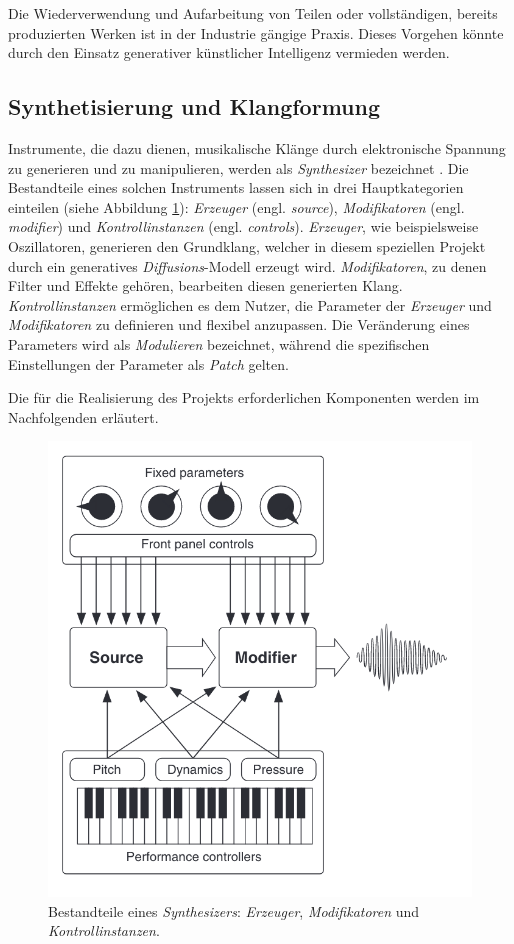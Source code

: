 \documentclass[
  a4paper,  %
  twoside,  %
  bibliography=totoc,
  headsepline,
  cleardoublepage=empty,
  parskip=half,
  draft=false
]{scrbook}
\begin{document}
Die Wiederverwendung und Aufarbeitung von Teilen oder vollständigen, bereits produzierten Werken ist in der Industrie gängige Praxis. Dieses Vorgehen könnte durch den Einsatz generativer künstlicher Intelligenz vermieden werden.

\subsection{Synthetisierung und Klangformung} \label{sec:synth+envelope}

Instrumente, die dazu dienen, musikalische Klänge durch elektronische Spannung zu generieren und zu manipulieren, werden als \emph{Synthesizer} bezeichnet \cite{dudenredaktion_synthesizer_nodate, pirkle_designing_2021}. Die Bestandteile eines solchen Instruments lassen sich in drei Hauptkategorien einteilen (siehe Abbildung \ref{fig:synth}): \emph{Erzeuger} (engl. \emph{source}), \emph{Modifikatoren} (engl. \emph{modifier}) und \emph{Kontrollinstanzen} (engl. \emph{controls}). \emph{Erzeuger}, wie beispielsweise Oszillatoren, generieren den Grundklang, welcher in diesem speziellen Projekt durch ein generatives \emph{Diffusions}-Modell erzeugt wird. \emph{Modifikatoren}, zu denen Filter und Effekte gehören, bearbeiten diesen generierten Klang. \emph{Kontrollinstanzen} ermöglichen es dem Nutzer, die Parameter der \emph{Erzeuger} und \emph{Modifikatoren} zu definieren und flexibel anzupassen. Die Veränderung eines Parameters wird als \emph{Modulieren} bezeichnet, während die spezifischen Einstellungen der Parameter als \emph{Patch} gelten. \cite{pirkle_designing_2021}   

Die für die Realisierung des Projekts erforderlichen Komponenten werden im Nachfolgenden erläutert.

\begin{figure}[h]
  \centering
  \includegraphics[width=.5\textwidth]{graphics/synthstruc.png}
  \caption[Synth]{Bestandteile eines \emph{Synthesizers}: \emph{Erzeuger}, \emph{Modifikatoren} und \emph{Kontrollinstanzen}. \cite{russ_sound_2009}}
  \label{fig:synth}
\end{figure}
\end{document}
